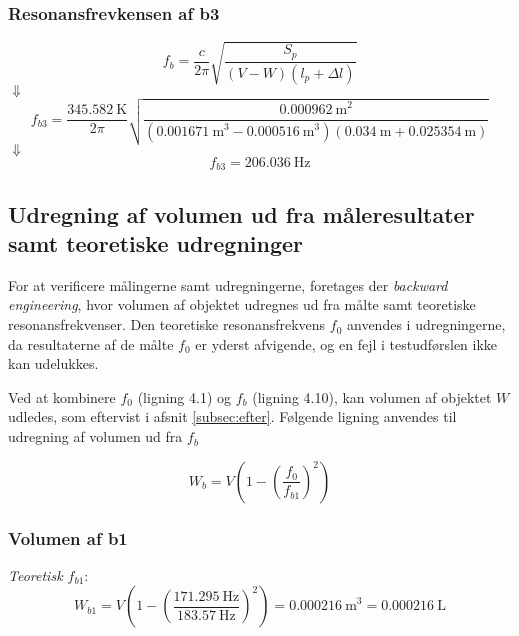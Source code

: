 \subsubsection{Resonansfrevkensen af b3} 
\hspace{1,5cm}
\begin{equation}
		f_{b} = \frac{c}{2\pi}\sqrt{\frac{S_{p}}{(V-W)(l_{p}+\Delta l)}}
	\end{equation}
$\Downarrow$
\begin{equation}
		f_{b3} = \frac{{\SI{345,582}{\kelvin}}}{2\pi}\sqrt{\frac{{\SI{0,000962}{\meter}^2}}{({\SI{0,001671}{\meter}^3}-{\SI{0,000516}{\meter}^3})({\SI{0,034}{\meter}}+ {\SI{0.025354}{\meter}})}}	
\end{equation}
$\Downarrow$
\begin{equation}
		f_{b3} = {\SI{206,036}{\hertz}}
\end{equation}

\subsection{Udregning af volumen ud fra måleresultater samt teoretiske udregninger}

For at verificere målingerne samt udregningerne, foretages der \textit{backward engineering}, hvor volumen af objektet udregnes ud fra målte samt teoretiske resonansfrekvenser. Den teoretiske resonansfrekvens $f_{0}$ anvendes i udregningerne, da resultaterne af de målte $f_{0}$ er yderst afvigende, og en fejl i testudførslen ikke kan udelukkes.    

Ved at kombinere $f_{0}$ (ligning 4.1) og $f_{b}$ (ligning 4.10), kan volumen af objektet $W$ udledes, som eftervist i afsnit \ref{subsec:efter}. Følgende ligning anvendes til udregning af volumen ud fra $f_{b}$

\begin{equation}
		W_{b} = V\left(1-\left(\frac{f_{0}}{f_{b1}}\right)^2\right)
\end{equation}
 

\subsubsection{Volumen af b1}

\textit{Teoretisk $f_{b1}$}:
\begin{equation}
		W_{b1} = V\left(1-\left(\frac{{\SI{171,295}{\hertz}}
}{{\SI{183,57}{\hertz}}}\right)^2\right) = {\SI{0,000216}{\meter}^3} = {\SI{0,000216}{\liter}}
\end{equation}

